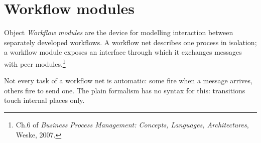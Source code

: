 \section{Workflow modules}

\begin{notebox}{Object}
\emph{Workflow modules} are the device for modelling interaction between separately developed workflows. A workflow net describes one process in isolation; a workflow module exposes an interface through which it exchanges messages with peer modules.\footnote{Ch.6 of \emph{Business Process Management: Concepts, Languages, Architectures}, Weske, 2007.}
\end{notebox}
Not every task of a workflow net is automatic: some fire when a message arrives, others fire to send one. The plain formalism has no syntax for this: transitions touch internal places only.


